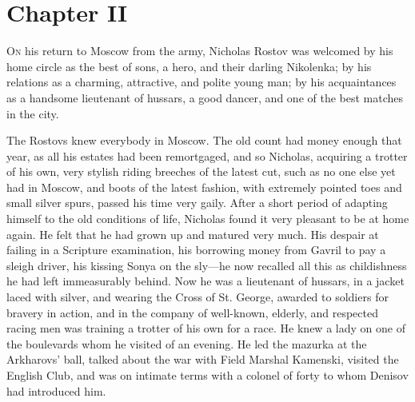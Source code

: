 
\chapter*{Chapter II}
\ifaudio     
{} 
\fi

\lettrine[lines=2, loversize=0.3, lraise=0]{\initfamily O}{n}
his return to Moscow from the army, Nicholas Rostov was
welcomed by his home circle as the best of sons, a hero, and
their darling Nikolenka; by his relations as a charming,
attractive, and polite young man; by his acquaintances as a
handsome lieutenant of hussars, a good dancer, and one of the
best matches in the city.

The Rostovs knew everybody in Moscow. The old count had money
enough that year, as all his estates had been remortgaged, and so
Nicholas, acquiring a trotter of his own, very stylish riding
breeches of the latest cut, such as no one else yet had in
Moscow, and boots of the latest fashion, with extremely pointed
toes and small silver spurs, passed his time very gaily. After a
short period of adapting himself to the old conditions of life,
Nicholas found it very pleasant to be at home again. He felt that
he had grown up and matured very much. His despair at failing in
a Scripture examination, his borrowing money from Gavril to pay a
sleigh driver, his kissing Sonya on the sly---he now recalled all
this as childishness he had left immeasurably behind. Now he was
a lieutenant of hussars, in a jacket laced with silver, and
wearing the Cross of St. George, awarded to soldiers for bravery
in action, and in the company of well-known, elderly, and
respected racing men was training a trotter of his own for a
race. He knew a lady on one of the boulevards whom he visited of
an evening. He led the mazurka at the Arkharovs' ball, talked
about the war with Field Marshal Kamenski, visited the English
Club, and was on intimate terms with a colonel of forty to whom
Denisov had introduced him.

